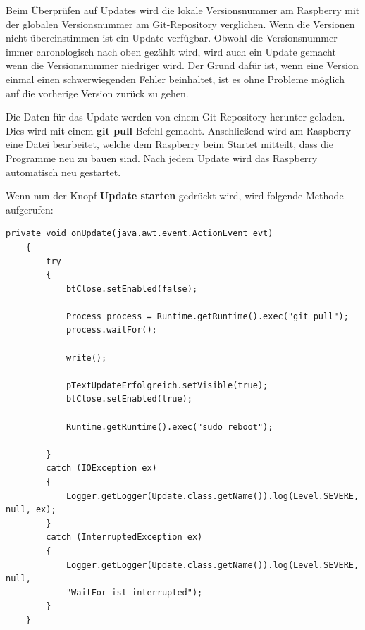 \vspace{10pt}

Beim Überprüfen auf Updates wird die lokale Versionsnummer am Raspberry mit der globalen Versionsnummer am Git-Repository verglichen. Wenn die Versionen nicht übereinstimmen ist ein Update verfügbar. Obwohl die Versionsnummer immer chronologisch nach oben gezählt wird, wird auch ein Update gemacht wenn die Versionsnummer niedriger wird. Der Grund dafür ist, wenn eine Version einmal einen schwerwiegenden Fehler beinhaltet, ist es ohne Probleme möglich auf die vorherige Version zurück zu gehen. 

\vspace{10pt}

Die Daten für das Update werden von einem Git-Repository herunter geladen. Dies wird mit einem \textbf{git pull} Befehl gemacht. Anschließend wird am Raspberry eine Datei bearbeitet, welche dem Raspberry beim Startet mitteilt, dass die Programme neu zu bauen sind. Nach jedem Update wird das Raspberry automatisch neu gestartet.

\vspace{10pt}

Wenn nun der Knopf \textbf{Update starten} gedrückt wird, wird folgende Methode aufgerufen:
\begin{lstlisting}[style=JavaStyle, caption= Update]
    private void onUpdate(java.awt.event.ActionEvent evt)                          
    {                              
        try
        {
            btClose.setEnabled(false);
            
            Process process = Runtime.getRuntime().exec("git pull");
            process.waitFor();

            write();

            pTextUpdateErfolgreich.setVisible(true);
            btClose.setEnabled(true);

            Runtime.getRuntime().exec("sudo reboot");

        }
        catch (IOException ex)
        {
            Logger.getLogger(Update.class.getName()).log(Level.SEVERE, null, ex);
        }
        catch (InterruptedException ex)
        {
            Logger.getLogger(Update.class.getName()).log(Level.SEVERE, null, 
            "WaitFor ist interrupted");
        }        
    }
\end{lstlisting}

\newpage

